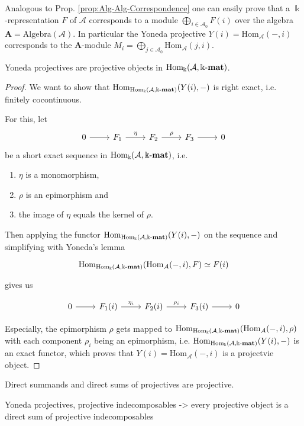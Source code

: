 Analogous to Prop. \ref{prop:Alg-Alg-Correspondence} one can easily prove that a $\Bbbk$-representation $F$ of $\mathcal{A}$ corresponds to a 
module $\bigoplus_{i \in \mathcal{A}_{0}} F(i)$ over the algebra $\mathbf{A} = \mathrm{Algebra}(\mathcal{A})$.
In particular the Yoneda projective $Y(i) = \mathrm{Hom}_{\mathcal{A}}(-,i)$ corresponds to the $\mathbf{A}$-module
$M_{i} = \bigoplus_{j \in \mathcal{A}_{0}} \mathrm{Hom}_{\mathcal{A}}(j,i)$.

\begin{lemma}
Yoneda projectives are projective objects in $\mathrm{Hom_{\Bbbk}}(\mathcal{A},\Bbbk\textnormal{-}\mathbf{mat})$.
\end{lemma}
\begin{proof}
We want to show that $\mathrm{Hom}_{\mathrm{Hom_{\Bbbk}}(\mathcal{A},\Bbbk\textnormal{-}\mathbf{mat})}(Y(i),-)$ is right exact, i.e. finitely cocontinuous.

For this, let
\[
\begin{tikzcd}
0 \arrow[r] & F_{1} \arrow[r, "\eta"] & F_{2} \arrow[r,"\rho"] & F_{3} \arrow[r] & 0
\end{tikzcd}
\]
be a short exact sequence in $\mathrm{Hom_{\Bbbk}}(\mathcal{A},\Bbbk\textnormal{-}\mathbf{mat})$, i.e.
\begin{enumerate}
\item $\eta$ is a monomorphism,
\item $\rho$ is an epimorphism and
\item the image of $\eta$ equals the kernel of $\rho$.
\end{enumerate}

Then applying the functor $\mathrm{Hom}_{\mathrm{Hom_{\Bbbk}}(\mathcal{A},\Bbbk\textnormal{-}\mathbf{mat})}(Y(i),-)$ on the sequence and simplifying with Yoneda's lemma

\[
\mathrm{Hom}_{\mathrm{Hom_{\Bbbk}}(\mathcal{A},\Bbbk\textnormal{-}\mathbf{mat})}(\mathrm{Hom}_{\mathcal{A}}(-,i),F) \simeq F(i)
\]

gives us

\[
\begin{tikzcd}
0 \arrow[r] & F_{1}(i) \arrow[r, "\eta_{i}"] &
F_{2}(i) \arrow[r,"\rho_{i}"] & F_{3}(i) \arrow[r] & 0
\end{tikzcd}
\]

Especially, the epimorphism $\rho$ gets mapped to $\mathrm{Hom}_{\mathrm{Hom_{\Bbbk}}(\mathcal{A},\Bbbk\textnormal{-}\mathbf{mat})}(\mathrm{Hom}_{\mathcal{A}}(-,i),\rho)$
with each component $\rho_{i}$ being an epimorphism, i.e. $\mathrm{Hom}_{\mathrm{Hom_{\Bbbk}}(\mathcal{A},\Bbbk\textnormal{-}\mathbf{mat})}(Y(i),-)$ is an exact functor, which
proves that $Y(i) = \mathrm{Hom}_{\mathcal{A}}(-,i)$ is a projectvie object.
\end{proof}

Direct summands and direct sums of projectives are projective.

Yoneda projectives, projective indecomposables -> every projective object is a direct sum of projective indecomposables

